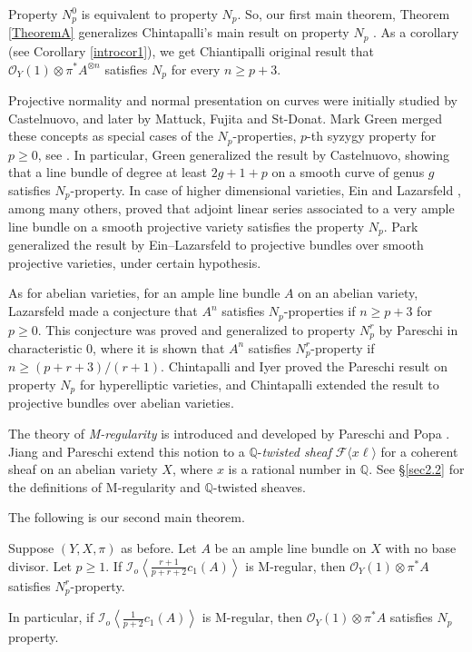 \documentclass[11pt,letter]{amsart}
\numberwithin{equation}{section}
\begin{document}
  
Property $N_p^0$ is equivalent to property $N_p$. So, our first main theorem, Theorem \ref{TheoremA} generalizes Chintapalli's main result on property $N_p$ \cite[Theorem 1.2]{Chi19}. As a corollary (see Corollary \ref{introcor1}), we get Chiantipalli original result that $\mathcal{O}_Y(1)\otimes\pi^* A^{\otimes n}$ satisfies $N_p$ for every $n\geq p+3$.
    
    
  
Projective normality and normal presentation on curves were initially studied by Castelnuovo, and later by Mattuck, Fujita and St-Donat. Mark Green merged these concepts as special cases of the $N_p$-properties, $p$-th syzygy property for $p\geq 0$,   see \cite{green1984koszul,GreenII,GreenIII}. In particular, Green generalized the result by Castelnuovo, showing that a line bundle of degree at least $2g+1+p$ on a smooth curve of genus $g$ satisfies $N_p$-property. In case of higher dimensional varieties, Ein and Lazarsfeld \cite{EL}, among many others, proved that adjoint linear series associated to a very ample line bundle on a smooth projective variety satisfies the property $N_p$. Park \cite{Park} generalized the result by Ein--Lazarsfeld to projective bundles over smooth projective varieties, under certain hypothesis.
  
  As for abelian varieties, for an ample line bundle $A$ on an abelian variety,  Lazarsfeld made a conjecture that $A^n$ satisfies $N_p$-properties if $n\geq p+3$ for $p\geq 0$. This conjecture was proved and generalized to property $N_p^r$ by Pareschi \cite{pareschi2000syzygies} in characteristic $0$, where it is shown that $A^n$ satisfies $N_p^r$-property if $n\geq (p+r+3)/(r+1)$. Chintapalli and Iyer \cite{ChiIyer} proved the Pareschi result on property $N_p$ for hyperelliptic varieties, and Chintapalli \cite[Theorem 1.2]{Chi19} extended the result to projective bundles over abelian varieties. 
  
  
 The theory of {\it M-regularity} is introduced and developed by Pareschi and Popa \cite{PP03,PP04,PP11}. Jiang and Pareschi \cite{JiPa2020} extend this notion to a $\mathbb{Q}$-{\it twisted sheaf} $\mathcal{F}\langle x\ell\rangle$ for a coherent sheaf on an abelian variety $X$, where $x$ is a rational number in $\mathbb{Q}$. See \S\ref{sec2.2} for the definitions of M-regularity and $\mathbb{Q}$-twisted sheaves. 
  
  The following is our second main theorem.  

\begin{introthm}\label{TheoremC}
Suppose $(Y,X,\pi)$ as before. 
Let $A$ be an ample line bundle on $X$ with no base divisor. Let $p\geq 1$.
 If $\mathcal{I}_o\left\langle \frac{r+1}{p+r+2}c_1(A)\right\rangle$ is M-regular, then $\mathcal{O}_Y(1)\otimes\pi^*A$ satisfies $N_p^r$-property.  
 
 In particular, if $\mathcal{I}_o\left\langle \frac{1}{p+2}c_1(A)\right\rangle$ is M-regular, then $\mathcal{O}_Y(1)\otimes\pi^*A$ satisfies $N_p$ property. 
\end{introthm}
\end{document}
